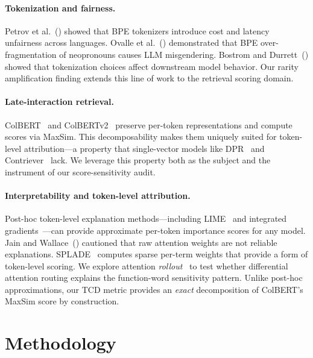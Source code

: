 \documentclass[11pt]{article}
\begin{document}
\paragraph{Tokenization and fairness.}
Petrov et al.~(\citeyear{petrov2023}) showed that BPE tokenizers introduce cost and latency unfairness across languages. Ovalle et al.~(\citeyear{ovalle2024}) demonstrated that BPE over-fragmentation of neopronouns causes LLM misgendering. Bostrom and Durrett~(\citeyear{bostrom2020}) showed that tokenization choices affect downstream model behavior. Our rarity amplification finding extends this line of work to the retrieval scoring domain.

\paragraph{Late-interaction retrieval.}
ColBERT~\citep{khattab2020} and ColBERTv2~\citep{santhanam2022} preserve per-token representations and compute scores via MaxSim. This decomposability makes them uniquely suited for token-level attribution---a property that single-vector models like DPR~\citep{karpukhin2020} and Contriever~\citep{izacard2022} lack. We leverage this property both as the subject and the instrument of our score-sensitivity audit.

\paragraph{Interpretability and token-level attribution.}
Post-hoc token-level explanation methods---including LIME~\citep{ribeiro2016} and integrated gradients~\citep{sundararajan2017}---can provide approximate per-token importance scores for any model. Jain and Wallace~(\citeyear{jain2019}) cautioned that raw attention weights are not reliable explanations. SPLADE~\citep{formal2021} computes sparse per-term weights that provide a form of token-level scoring. We explore attention \emph{rollout}~\citep{abnar2020} to test whether differential attention routing explains the function-word sensitivity pattern. Unlike post-hoc approximations, our TCD metric provides an \emph{exact} decomposition of ColBERT's MaxSim score by construction.

\section{Methodology}
\label{sec:method}
\end{document}
